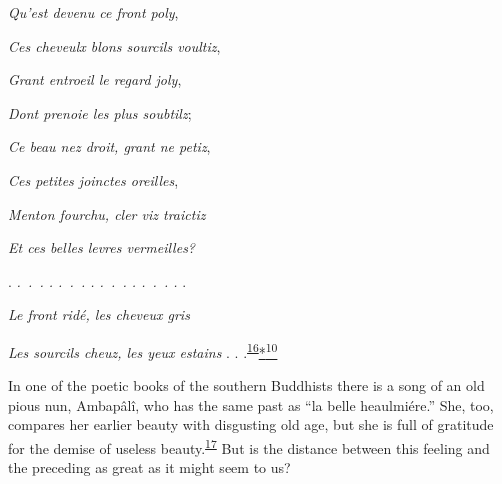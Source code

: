 \emph{Qu'est devenu ce front poly},

\emph{Ces cheveulx blons sourcils voultiz},

\emph{Grant entroeil le regard joly},

\emph{Dont prenoie les plus soubtilz};

\emph{Ce beau nez droit, grant ne petiz},

\emph{Ces petites joinctes oreilles},

\emph{Menton fourchu, cler viz traictiz}

\emph{Et ces belles levres vermeilles?}

. \emph{.~.~. . .~.~. . .~.~. . .~.~. .} .

\emph{\protect\hypertarget{12_Chapter_Five__THE_VISION_OF_DEAT.xhtmlux5cux23page_163}{}{}Le
front ridé, les cheveux gris}

\emph{Les sourcils cheuz, les yeux estains} . .
.\textsuperscript{\protect\hypertarget{12_Chapter_Five__THE_VISION_OF_DEAT.xhtmlux5cux23id_1320}{\protect\hyperlink{23_NOTES.xhtmlux5cux23id_1321}{16}}}\protect\hypertarget{12_Chapter_Five__THE_VISION_OF_DEAT.xhtmlux5cux23id_2969}{\protect\hyperlink{23_NOTES.xhtmlux5cux23id_2970}{*\textsuperscript{10}}}

In one of the poetic books of the southern Buddhists there is a song of
an old pious nun, Ambapâlî, who has the same past as ``la belle
heaulmiére.'' She, too, compares her earlier beauty with disgusting old
age, but she is full of gratitude for the demise of useless
beauty.\textsuperscript{\protect\hypertarget{12_Chapter_Five__THE_VISION_OF_DEAT.xhtmlux5cux23id_1318}{\protect\hyperlink{23_NOTES.xhtmlux5cux23id_1319}{17}}}
But is the distance between this feeling and the preceding as great as
it might seem to us?

